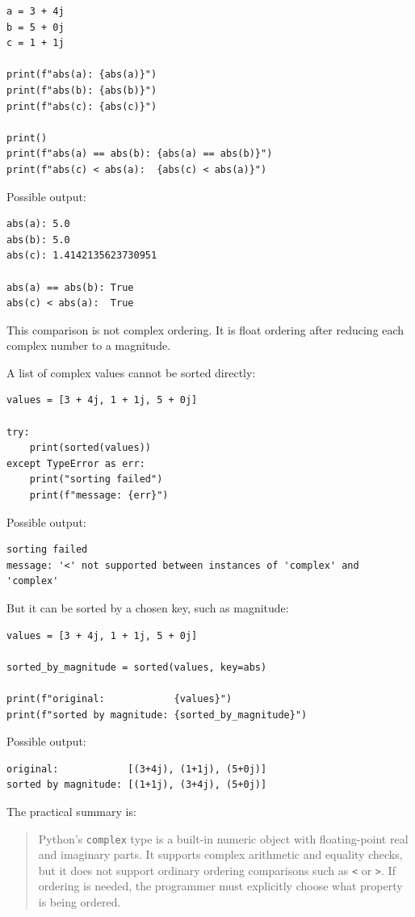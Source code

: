 \begin{verbatim}
a = 3 + 4j
b = 5 + 0j
c = 1 + 1j

print(f"abs(a): {abs(a)}")
print(f"abs(b): {abs(b)}")
print(f"abs(c): {abs(c)}")

print()
print(f"abs(a) == abs(b): {abs(a) == abs(b)}")
print(f"abs(c) < abs(a):  {abs(c) < abs(a)}")
\end{verbatim}

Possible output:

\begin{verbatim}
abs(a): 5.0
abs(b): 5.0
abs(c): 1.4142135623730951

abs(a) == abs(b): True
abs(c) < abs(a):  True
\end{verbatim}

This comparison is not complex ordering. It is float ordering after reducing each complex number to a magnitude.

A list of complex values cannot be sorted directly:

\begin{verbatim}
values = [3 + 4j, 1 + 1j, 5 + 0j]

try:
    print(sorted(values))
except TypeError as err:
    print("sorting failed")
    print(f"message: {err}")
\end{verbatim}

Possible output:

\begin{verbatim}
sorting failed
message: '<' not supported between instances of 'complex' and 'complex'
\end{verbatim}

But it can be sorted by a chosen key, such as magnitude:

\begin{verbatim}
values = [3 + 4j, 1 + 1j, 5 + 0j]

sorted_by_magnitude = sorted(values, key=abs)

print(f"original:            {values}")
print(f"sorted by magnitude: {sorted_by_magnitude}")
\end{verbatim}

Possible output:

\begin{verbatim}
original:            [(3+4j), (1+1j), (5+0j)]
sorted by magnitude: [(1+1j), (3+4j), (5+0j)]
\end{verbatim}

The practical summary is:

\begin{quote}
Python's \texttt{complex} type is a built-in numeric object with floating-point real and imaginary parts. It supports complex arithmetic and equality checks, but it does not support ordinary ordering comparisons such as \texttt{<} or \texttt{>}. If ordering is needed, the programmer must explicitly choose what property is being ordered.
\end{quote}